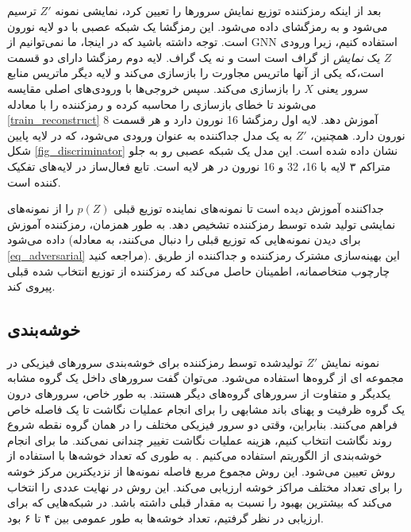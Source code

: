 بعد از اینکه رمزکننده توزیع نمایش سرور‌ها را تعیین کرد، نمایشی نمونه $ Z '$ ترسیم می‌شود و به رمزگشای داده می‌شود. این رمزگشا یک شبکه عصبی با دو لایه نورون است. توجه داشته باشید که در اینجا، ما نمی‌توانیم از GNN استفاده کنیم، زیرا ورودی $ Z $ یک  
\emph {نمایش} 
 از گراف است است و نه یک گراف. لایه دوم رمزگشا دارای دو قسمت است،که یکی از آنها ماتریس مجاورت را بازسازی می‌کند و لایه دیگر ماتریس منابع سرور یعنی $X$ را بازسازی می‌کند. سپس خروجی‌ها با ورودی‌های اصلی مقایسه می‌شوند تا خطای بازسازی را محاسبه کرده و رمزکننده را با معادله
  \eqref {train_reconstruct}
   آموزش دهد. لایه اول رمزگشا 16  نورون دارد و هر قسمت 8 نورون دارد.
   همچنین، $ Z '$ به یک مدل جداکننده به عنوان ورودی می‌شود، که در لایه پایین شکل
\ref {fig_discriminator}
   نشان داده شده است. این مدل یک شبکه عصبی رو به جلو متراکم ۳ لایه با 16، 32 و 16 نورون در هر لایه است. تابع فعال‌ساز در لایه‌های تفکیک کننده  است.
   
  جداکننده آموزش دیده است تا نمونه‌های نماینده توزیع قبلی $ p (Z) $ را از نمونه‌های نمایشی تولید شده توسط رمزکننده تشخیص دهد. به طور همزمان، رمزکننده آموزش داده می‌شود (برای دیدن نمونه‌هایی که توزیع قبلی را دنبال می‌کنند، به معادله
   \eqref {eq_adversarial}
    مراجعه کنید). این بهینه‌سازی مشترک رمزکننده و جداکننده از طریق چارچوب متخاصمانه، اطمینان حاصل می‌کند که رمزکننده از توزیع انتخاب شده قبلی پیروی کند.
    
    \subsection{خوشه‌بندی}
    
    نمونه نمایش $ Z '$ تولید‌شده توسط رمزکننده برای خوشه‌بندی سرورهای فیزیکی در مجموعه ای از گروه‌ها استفاده می‌شود. می‌توان گفت سرورهای داخل یک گروه مشابه یکدیگر و متفاوت از سرورهای گروه‌های دیگر هستند.
    به طور خاص، سرورهای درون یک گروه ظرفیت و  پهنای باند مشابهی را برای انجام عملیات نگاشت  تا یک فاصله خاص فراهم می‌کنند. بنابراین‌، وقتی دو سرور فیزیکی مختلف را در همان گروه نقطه شروع روند نگاشت انتخاب کنیم، هزینه عملیات نگاشت تغییر چندانی نمی‌کند.
    ما برای انجام خوشه‌بندی از الگوریتم  استفاده می‌کنیم . به طوری که تعداد خوشه‌ها با استفاده از روش  
    \cite {elbowMethod} 
    تعیین می‌شود. این روش مجموع مربع فاصله نمونه‌ها از نزدیکترین مرکز خوشه را برای تعداد مختلف مراکز خوشه ارزیابی می‌کند. این روش در نهایت عددی را انتخاب می‌کند که بیشترین بهبود را نسبت به مقدار قبلی داشته باشد. در شبکه‌هایی که برای ارزیابی در نظر گرفتیم، تعداد خوشه‌ها به طور عمومی بین ۴ تا ۶ بود. 
 
